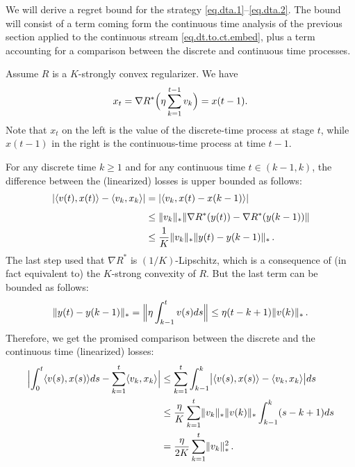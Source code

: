 \documentclass[12pt]{article}
\theoremstyle{plain}
\theoremstyle{definition}
\theoremstyle{remark}
\begin{document}
\medskip

We will derive a regret bound for the strategy \eqref{eq.dta.1}--\eqref{eq.dta.2}.
The bound will consist of a term coming form the continuous time analysis of the previous section 
applied to the continuous stream \eqref{eq.dt.to.ct.embed}, 
plus a term accounting for a comparison between the discrete and continuous time processes.

\medskip

Assume $R$ is a $K$-strongly convex regularizer.
We have
$$
x_{t} = \nabla R^{*} \Bigl( \eta \sum_{k=1}^{t-1} v_{k} \Bigr) = x(t-1).
$$
Note that $x_t$ on the left is the value of the discrete-time process at stage $t$,
while $x(t-1)$ in the right is the continuous-time process at time $t-1$.

\medskip

For any discrete time $k \geq 1$ and for any continuous time $t \in (k-1,k)$,
the difference between the (linearized) losses is upper bounded as follows:
\begin{align*}
\lvert  \langle {v(t),x(t)}\rangle - \langle {v_{k},x_{k}}\rangle  \rvert
&= \lvert  \langle {v_{k}, x(t) - x(k-1)}\rangle  \rvert \\[1.5mm]
&\leq \lVert v_{k} \rVert_{*} \lVert  \nabla R^{*}(y(t)) - \nabla R^{*}(y(k-1))  \rVert \\
&\leq \frac{1}{K} \lVert v_{k} \rVert_{*} \lVert y(t) - y(k-1) \rVert_{*}\,.
\end{align*}
The last step used that $\nabla R^{*}$ is $(1/K)$-Lipschitz,
which is a consequence of (in fact equivalent to) the $K$-strong convexity of $R$.
But the last term can be bounded as follows:
$$
\lVert y(t) - y(k-1) \rVert_{*}
= \Bigl\lVert  \eta \int_{k-1}^{t} v(s) ds  \Bigr\rVert
\leq \eta (t-k+1) \lVert v(k) \rVert_{*}\,.
$$
Therefore, we get the promised comparison between the discrete and the continuous time
(linearized) losses:
\begin{align*}
\Bigl\lvert  \int_{0}^{t} \langle {v(s),x(s)}\rangle ds - \sum_{k=1}^{t} \langle {v_{k},x_{k}}\rangle  \Bigr\rvert
&\leq \sum_{k=1}^{t} \int_{k-1}^{k} \bigl\lvert  \langle {v(s),x(s)}\rangle - \langle {v_{k},x_{k}}\rangle  \bigr\rvert ds \\
&\leq \frac{\eta}{K} \sum_{k=1}^{t} \lVert v_{k} \rVert_{*} \lVert v(k) \rVert_{*} \int_{k-1}^{k} (s-k+1) ds \\
&= \frac{\eta}{2K} \sum_{k=1}^{t} \lVert v_{k} \rVert_{*}^2\,.
\end{align*}
\end{document}
